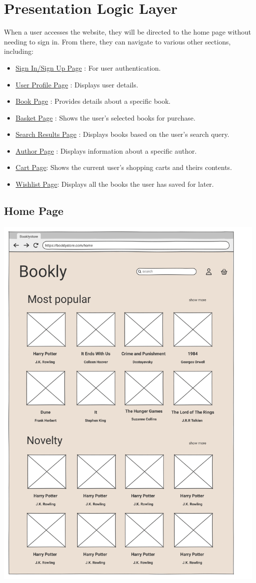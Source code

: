 \section{Presentation Logic Layer}
When a user accesses the website, they will be directed to the home page without needing to sign in. From there, they can navigate to various other sections, including:
\begin{itemize}
    \item \hyperref[sec:signin]{Sign In/Sign Up Page} : For user authentication.
    \item \hyperref[sec:profile]{User Profile Page} : Displays user details.
    \item \hyperref[sec:book]{Book Page} : Provides details about a specific book.
    \item \hyperref[sec:basket]{Basket Page} : Shows the user's selected books for purchase.
    \item \hyperref[sec:search]{Search Results Page} : Displays books based on the user’s search query.
    \item \hyperref[sec:author]{Author Page} : Displays information about a specific author.
    \item \hyperref[sec:cart]{Cart Page}: Shows the current user's shopping carts and theirs contents.
    \item \hyperref[sec:wishlist]{Wishlist Page}: Displays all the books the user has saved for later.

\end{itemize}



\subsection{Home Page}

\includegraphics[width=0.6\linewidth]{HW1Report/photos/homepage.png}

